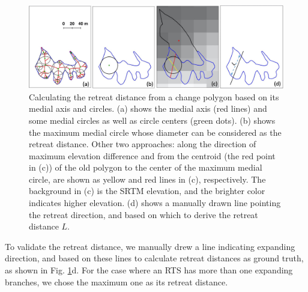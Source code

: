 \documentclass[authoryear,preprint,review,12pt]{elsarticle}
\begin{document}
\begin{figure} 
	\centering
	\includegraphics[width=14cm]{figs/retreat_distance_trim.jpg}
	\caption{Calculating the retreat distance from a change polygon based on its medial axis and circles. (a) shows the medial axis (red lines) and some medial circles as well as circle centers (green dots). (b) shows the maximum medial circle whose diameter can be considered as the retreat distance. Other two approaches: along the direction of maximum elevation difference and from the centroid (the red point in (c)) of the old polygon to the center of the maximum medial circle, are shown as yellow and red lines in (c), respectively. The background in (c) is the SRTM elevation, and the brighter color indicates higher elevation. (d) shows a manually drawn line pointing the retreat direction, and based on which to derive the retreat distance $L$. }
	\label{fig_retreat_dis}
\end{figure}






To validate the retreat distance, we manually drew a line indicating expanding direction, and based on these lines to calculate retreat distances as ground truth, as shown in Fig. \ref{fig_retreat_dis}d. 
For the case where an RTS has more than one expanding branches, we chose the maximum one as its retreat distance. 



\end{document}
